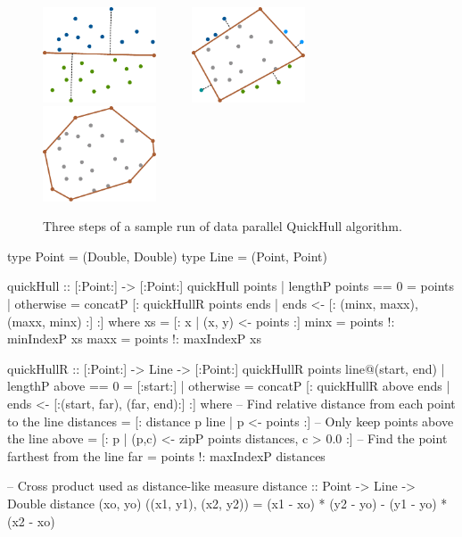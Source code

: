 \documentclass[preamble.tex]{subfiles}
\begin{document}
\begin{figure}
\includegraphics[width=0.3\textwidth]{img/Example-QuickHull-step1}~~~~~%
\includegraphics[width=0.3\textwidth]{img/Example-QuickHull-step2}~~~~~%
\includegraphics[width=0.3\textwidth]{img/Example-QuickHull-step3}%
\caption{Three steps of a sample run of data parallel QuickHull algorithm.}
\label{fig:qh-result}
\end{figure}


\begin{hscode}[%
  caption={\label{fig:dph-qh}\name{Data Parallel Haskell} implementation of QuickHull.},
  numbers=left,
]
type Point = (Double, Double)
type Line  = (Point,  Point)

quickHull :: [:Point:] -> [:Point:]
quickHull points
  | lengthP points == 0 = points
  | otherwise
  = concatP [: quickHullR points ends
                 | ends <- [: (minx, maxx), (maxx, minx) :] :]
  where
    xs   = [: x | (x, y) <- points :]
    minx = points !: minIndexP xs
    maxx = points !: maxIndexP xs

quickHullR :: [:Point:] -> Line -> [:Point:]
quickHullR points line@(start, end)
  | lengthP above == 0 = [:start:]
  | otherwise
  = concatP [: quickHullR above ends
                 | ends <- [:(start, far), (far, end):] :]
  where
    -- Find relative distance from each point to the line
    distances = [: distance p line | p <- points :]
    -- Only keep points above the line
    above = [: p | (p,c) <- zipP points distances, c > 0.0 :]
    -- Find the point farthest from the line
    far = points !: maxIndexP distances

-- Cross product used as distance-like measure
distance :: Point -> Line -> Double
distance (xo, yo) ((x1, y1), (x2, y2))
  = (x1 - xo) * (y2 - yo) - (y1 - yo) * (x2 - xo)
\end{hscode}
\end{document}
